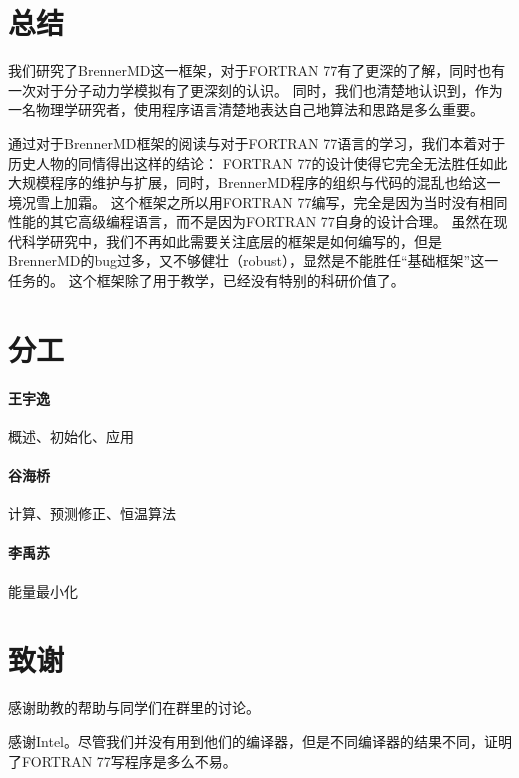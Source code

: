 \documentclass{ctexart}
\begin{document}
\section{总结}
我们研究了BrennerMD这一框架，对于FORTRAN 77有了更深的了解，同时也有一次对于分子动力学模拟有了更深刻的认识。
同时，我们也清楚地认识到，作为一名物理学研究者，使用程序语言清楚地表达自己地算法和思路是多么重要。

通过对于BrennerMD框架的阅读与对于FORTRAN 77语言的学习，我们本着对于历史人物的同情得出这样的结论：
FORTRAN 77的设计使得它完全无法胜任如此大规模程序的维护与扩展，同时，BrennerMD程序的组织与代码的混乱也给这一境况雪上加霜。
这个框架之所以用FORTRAN 77编写，完全是因为当时没有相同性能的其它高级编程语言，而不是因为FORTRAN 77自身的设计合理。
虽然在现代科学研究中，我们不再如此需要关注底层的框架是如何编写的，但是BrennerMD的bug过多，又不够健壮（robust），显然是不能胜任“基础框架”这一任务的。
这个框架除了用于教学，已经没有特别的科研价值了。

\section{分工}
\paragraph{王宇逸}概述、初始化、应用
\paragraph{谷海桥}计算、预测修正、恒温算法
\paragraph{李禹苏}能量最小化

\section{致谢}
感谢助教的帮助与同学们在群里的讨论。

感谢Intel。尽管我们并没有用到他们的编译器，但是不同编译器的结果不同，证明了FORTRAN 77写程序是多么不易。
\end{document}

